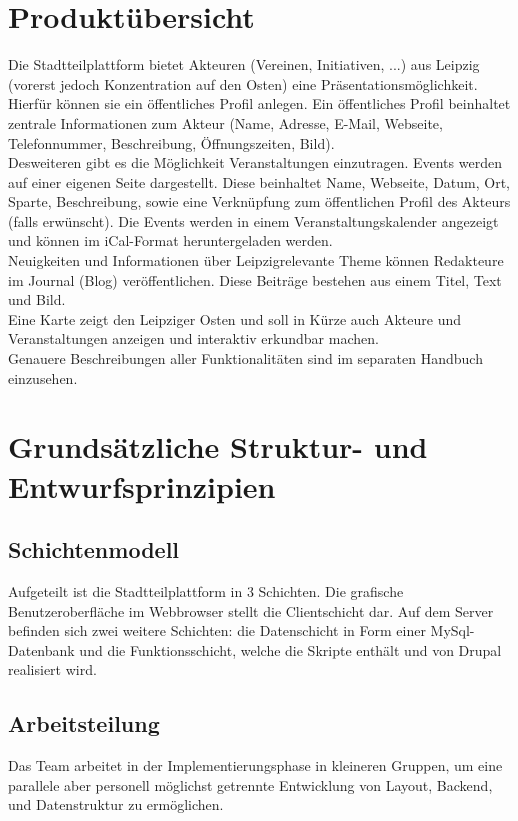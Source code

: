 \documentclass{swp}
\begin{document}
\section{Produkt\"ubersicht}
Die Stadtteilplattform bietet Akteuren (Vereinen, Initiativen, ...) aus Leipzig (vorerst jedoch Konzentration auf den Osten) eine Pr\"asentationsm\"oglichkeit. Hierf\"ur k\"onnen sie ein \"offentliches Profil anlegen. Ein \"offentliches Profil beinhaltet zentrale Informationen zum Akteur (Name, Adresse, E-Mail, Webseite, Telefonnummer, Beschreibung, \"Offnungszeiten, Bild).\\
Desweiteren gibt es die M\"oglichkeit Veranstaltungen einzutragen. Events werden auf einer eigenen Seite dargestellt. Diese beinhaltet Name, Webseite, Datum, Ort, Sparte, Beschreibung,  sowie eine Verkn\"upfung zum \"offentlichen Profil des Akteurs (falls erw\"unscht). Die Events werden in einem Veranstaltungskalender angezeigt und k\"onnen im iCal-Format heruntergeladen werden.\\
Neuigkeiten und Informationen \"uber Leipzigrelevante Theme k\"onnen Redakteure im Journal (Blog) ver\"offentlichen. Diese Beitr\"age bestehen aus einem Titel, Text und Bild.\\
Eine Karte zeigt den Leipziger Osten und soll in K\"urze auch Akteure und Veranstaltungen anzeigen und interaktiv erkundbar machen.\\
Genauere Beschreibungen aller Funktionalit\"aten sind im separaten Handbuch einzusehen.
\section{Grunds\"atzliche Struktur- und Entwurfsprinzipien}
\subsection{Schichtenmodell}
Aufgeteilt ist die Stadtteilplattform in 3 Schichten. Die grafische Benutzeroberfl\"ache im Webbrowser stellt die Clientschicht dar. Auf dem Server befinden sich zwei weitere Schichten: die Datenschicht in Form einer MySql-Datenbank und die Funktionsschicht, welche die Skripte enth\"alt und von Drupal realisiert wird.
\subsection{Arbeitsteilung}
Das Team arbeitet in der Implementierungsphase in kleineren Gruppen, um eine parallele aber personell m\"oglichst getrennte Entwicklung von Layout, Backend, und Datenstruktur zu erm\"oglichen.
\end{document}
